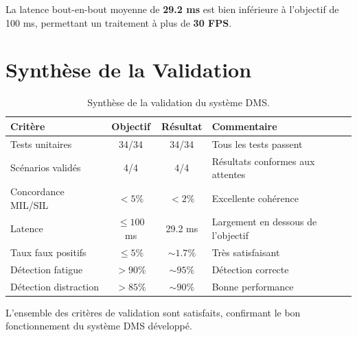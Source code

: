 La latence bout-en-bout moyenne de \textbf{29.2 ms} est bien inférieure à l'objectif de 100 ms, permettant un traitement à plus de \textbf{30 FPS}.

\section{Synthèse de la Validation}

\begin{table}[H]
\centering
\caption{Synthèse de la validation du système DMS.}
\label{tab:validation_summary}
\renewcommand{\arraystretch}{1.4}
\begin{tabularx}{\textwidth}{|l|c|c|X|}
\hline
\rowcolor{stellantisblue!15}
\textbf{Critère} & \textbf{Objectif} & \textbf{Résultat} & \textbf{Commentaire} \\
\hline
Tests unitaires & 34/34 & \cellcolor{green!20} 34/34 & Tous les tests passent \\
\hline
Scénarios validés & 4/4 & \cellcolor{green!20} 4/4 & Résultats conformes aux attentes \\
\hline
Concordance MIL/SIL & $< 5\%$ & \cellcolor{green!20} $< 2\%$ & Excellente cohérence \\
\hline
Latence & $\leq 100$ ms & \cellcolor{green!20} 29.2 ms & Largement en dessous de l'objectif \\
\hline
Taux faux positifs & $\leq 5\%$ & \cellcolor{green!20} $\sim 1.7\%$ & Très satisfaisant \\
\hline
Détection fatigue & $> 90\%$ & \cellcolor{green!20} $\sim 95\%$ & Détection correcte \\
\hline
Détection distraction & $> 85\%$ & \cellcolor{green!20} $\sim 90\%$ & Bonne performance \\
\hline
\end{tabularx}
\end{table}

L'ensemble des critères de validation sont satisfaits, confirmant le bon fonctionnement du système DMS développé.

